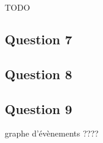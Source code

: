 TODO 
\subsection{Question 7}

\subsection{Question 8}

\subsection{Question 9}
graphe d'évènements ????

